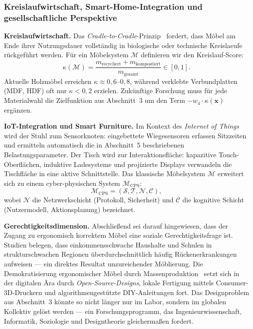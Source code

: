 \documentclass[a4paper,12pt]{article}
\theoremstyle{definition}
\begin{document}
\subsubsection{Kreislaufwirtschaft, Smart-Home-Integration und gesellschaftliche Perspektive}

\textbf{Kreislaufwirtschaft.}
Das \emph{Cradle-to-Cradle}-Prinzip~\cite{McDonoughBraungart2002} fordert, dass M\"{o}bel am Ende ihrer Nutzungsdauer
vollst\"{a}ndig in biologische oder technische Kreislaeufe r\"{u}ckgef\"{u}hrt werden.
F\"{u}r ein M\"{o}belsystem $\mathcal{M}$ definieren wir den Kreislauf-Score:
\[
	\kappa(\mathcal{M}) = \frac{m_{\mathrm{recycliert}} + m_{\mathrm{kompostiert}}}{m_{\mathrm{gesamt}}} \in [0, 1].
\]
Aktuelle Holzm\"{o}bel erreichen $\kappa \approx 0{,}6$--$0{,}8$, w\"{a}hrend
verklebte Verbundplatten (MDF, HDF) oft nur $\kappa < 0{,}2$ erzielen.
Zuk\"{u}nftige Forschung muss f\"{u}r jede Materialwahl die Zielfunktion aus
Abschnitt~3 um den Term $-w_4 \cdot \kappa(\mathbf{x})$ erg\"{a}nzen.

\textbf{IoT-Integration und Smart Furniture.}
Im Kontext des \emph{Internet of Things} wird der Stuhl zum Sensorknoten:
eingebettete Wiegesensoren erfassen Sitzzeiten und ermitteln automatisch
die in Abschnitt~5 beschriebenen Belastungsparameter.
Der Tisch wird zur Interaktionsfl\"{a}che: kapazitive Touch-Oberfl\"{a}chen,
induktive Ladesysteme und projizierte Displays verwandeln die Tischfl\"{a}che
in eine aktive Schnittstelle. Das klassische M\"{o}belsystem $\mathcal{M}$
erweitert sich zu einem cyber-physischen System $\mathcal{M}_{\mathrm{CPS}}$:
\[
	\mathcal{M}_{\mathrm{CPS}} = (\mathcal{S}, \mathcal{T}, \mathcal{N}, \mathcal{C}),
\]
wobei $\mathcal{N}$ die Netzwerkschicht (Protokoll, Sicherheit) und
$\mathcal{C}$ die kognitive Schicht (Nutzermodell, Aktionsplanung) bezeichnet.

\textbf{Gerechtigkeitsdimension.}
Abschlie\ss{}end sei darauf hingewiesen, dass der Zugang zu ergonomisch korrektem
M\"{o}bel eine soziale Gerechtigkeitsfrage ist. Studien belegen, dass
einkommensschwache Haushalte und Schulen in strukturschwachen Regionen
\"{u}berdurchschnittlich h\"{a}ufig R\"{u}ckenerkrankungen aufweisen --- ein direktes
Resultat unzureichender M\"{o}blierung.
Die Demokratisierung ergonomischer M\"{o}bel durch Massenproduktion~\cite{VegesackThonet1996}
setzt sich in der digitalen \"{A}ra durch \emph{Open-Source-Designs}, lokale Fertigung
mittels Consumer-3D-Druckern und algorithmengest\"{u}tzte DIY-Anleitungen fort.
Das Designproblem aus Abschnitt~3 k\"{o}nnte so nicht l\"{a}nger nur im Labor, sondern
im globalen Kollektiv gel\"{o}st werden --- ein Forschungsprogramm, das Ingenieurwissenschaft,
Informatik, Soziologie und Designtheorie gleicherma\ss{}en fordert.
\end{document}
